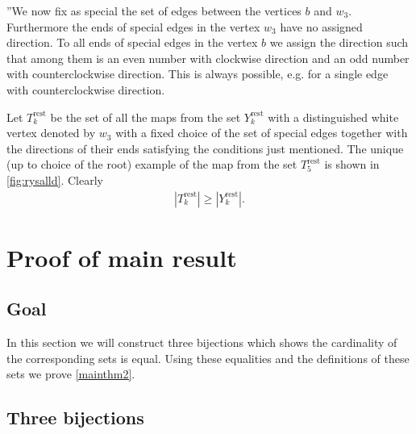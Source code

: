 \documentclass[submission]{FPSAC2021}
\DeclareMathOperator{\rest}{rest}
\begin{document}
”We now fix as special the set of edges between 
the vertices $b$ and $w_3$.
Furthermore the ends of special edges in the
vertex $w_3$ have no assigned direction. 
To all ends of special edges in the vertex 
$b$ we assign the direction such that among 
them is an even number with clockwise direction 
and an odd number with counterclockwise direction.
This is always possible, e.g. for a single edge 
with counterclockwise direction.

Let $T_k^{\rest}$ be the set of all the 
maps from the set $Y_k^{\rest}$ with a 
distinguished white vertex denoted by $w_3$ 
with a fixed choice of the set of special 
edges together with the directions of their 
ends satisfying the conditions just mentioned. 
The unique (up to choice of the root) example 
of the map from the set $T_{5}^{\rest}$ is 
shown in \cref{fig:rysalld}. Clearly
\begin{align}
\label{ineqrest}
|T_{k}^{\rest}| \geq |Y_{k}^{\rest}|.
\end{align}


\section{Proof of main result}

\subsection{Goal}
In this section we will construct three bijections 
which shows the cardinality of the corresponding sets 
is equal. Using these equalities and the definitions 
of these sets we prove \cref{mainthm2}.

\subsection{Three bijections}
\end{document}
